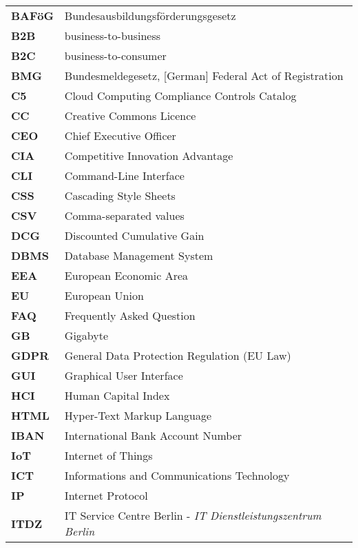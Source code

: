 \begin{flushleft}
\begin{tabular}{ll}
\textbf{BAFöG}	&	Bundesausbildungsförderungsgesetz\\
\textbf{B2B}	&	business-to-business\\
\textbf{B2C}	&	business-to-consumer\\
\textbf{BMG}	&	Bundesmeldegesetz, [German] Federal Act of Registration\\

\textbf{ C5} & Cloud Computing Compliance Controls Catalog\\
\textbf{CC}		&	Creative Commons Licence\\
\textbf{CEO}	&	Chief Executive Officer\\
\textbf{CIA}	&	Competitive Innovation Advantage\\
\textbf{CLI}	&	Command-Line Interface\\
\textbf{CSS}	&	Cascading Style Sheets\\
\textbf{CSV}	&	Comma-separated values\\

\textbf{DCG}	&	Discounted Cumulative Gain\\
\textbf{DBMS}	&	Database Management System\\


\textbf{EEA}		&	European Economic Area\\
\textbf{EU}		&	European Union\\


\textbf{FAQ}	&	Frequently Asked Question\\

\textbf{GB}		&	Gigabyte\\
\textbf{GDPR}	&	General Data Protection Regulation (EU Law)\\
\textbf{GUI}	&	Graphical User Interface\\

\textbf{HCI}	&	Human Capital Index\\
\textbf{HTML}	&	Hyper-Text Markup Language\\

\textbf{IBAN}	&	International Bank Account Number\\
\textbf{IoT}	&	Internet of Things\\
\textbf{ICT}	&	Informations and Communications Technology\\
\textbf{IP}	&	Internet Protocol\\

\textbf{ITDZ}	&	IT Service Centre Berlin - \textit{IT Dienstleistungszentrum Berlin}\\


\end{tabular}
\end{flushleft}
